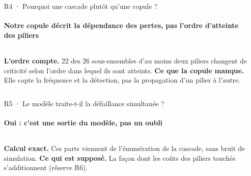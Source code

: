 \documentclass[aspectratio=169,10pt,t]{beamer}
\begin{document}
\begin{frame}[label=reserve-copule]{R4 · Pourquoi une cascade plutôt qu'une copule ?}
  \framesubtitle{Notre copule décrit la dépendance des pertes, pas l'ordre d'atteinte des piliers}
  \vspace{6mm}
  {\centering{}\par}
  \vspace{5mm}
  \begin{columns}[T,onlytextwidth]
    \footnotesize
    \textbf{L'ordre compte.} 22 des 26 sous-ensembles d'au moins deux piliers changent de criticité selon l'ordre dans lequel ils sont atteints.
    \footnotesize
    \textbf{Ce que la copule manque.} Elle capte la fréquence et la détection, pas la propagation d'un pilier à l'autre.
  \end{columns}
\end{frame}

\begin{frame}[label=reserve-simultane]{R5 · Le modèle traite-t-il la défaillance simultanée ?}
  \framesubtitle{Oui : c'est une sortie du modèle, pas un oubli}
  \vspace{6mm}
  {\centering{}\par}
  \vspace{5mm}
  \begin{columns}[T,onlytextwidth]
    \footnotesize
    \textbf{Calcul exact.} Ces parts viennent de l'énumération de la cascade, sans bruit de simulation.
    \footnotesize
    \textbf{Ce qui est supposé.} La façon dont les coûts des piliers touchés s'additionnent (réserve R6).
  \end{columns}
\end{frame}
\end{document}
